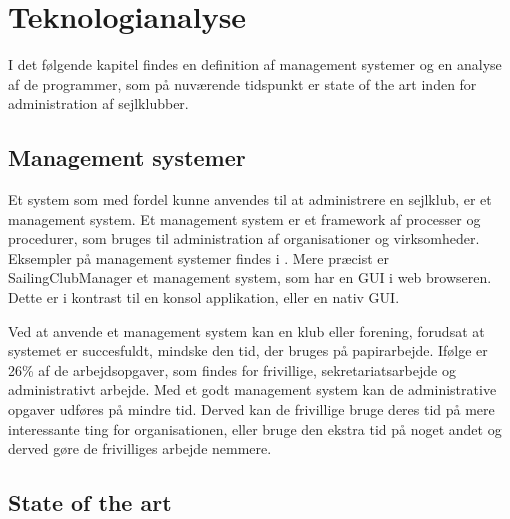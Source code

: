 \chapter{Teknologianalyse}\label{chap:teknologi-analyse}

I det følgende kapitel findes en definition af management systemer og en analyse af de programmer, som på nuværende tidspunkt er state of the art inden for administration af sejlklubber.

\section{Management systemer}\label{subsec:management-systemer}

Et system som med fordel kunne anvendes til at administrere en sejlklub, er et management system. 
Et management system er et framework af processer og procedurer, som bruges til administration af organisationer og virksomheder.
Eksempler på management systemer findes i . 
Mere præcist er SailingClubManager et management system, som har en \ac{GUI} i web browseren.
Dette er i kontrast til en konsol applikation, eller en nativ \ac{GUI}. 

Ved at anvende et management system kan en klub eller forening, forudsat at systemet er succesfuldt, mindske den tid, der bruges på papirarbejde. 
Ifølge \citet{Frivilligrapporten} er 26\% af de arbejdsopgaver, som findes for frivillige, sekretariatsarbejde og administrativt arbejde. 
Med et godt management system kan de administrative opgaver udføres på mindre tid. 
Derved kan de frivillige bruge deres tid på mere interessante ting for organisationen, eller bruge den ekstra tid på noget andet og derved gøre de frivilliges arbejde nemmere.


\section{State of the art}\label{sec:sota}

